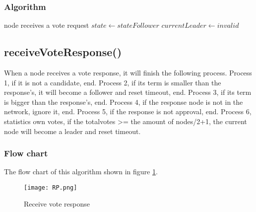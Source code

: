 \documentclass{report}
\begin{document}
\subsubsection{Algorithm}
\begin{simpleAlgorithm}{node receives a vote request}
     
        \State {}
        \State $state \gets stateFollower$
        \State {}
    \EndIf
     
        \State {}
        \State $currentLeader \gets invalid$
        \State {}
    \Else
        \State {}
    \EndIf
    \State {}
   \EndProcedure
\end{simpleAlgorithm}


\subsection{receiveVoteResponse()}
When a node receives a vote response, it will finish the following process. Process 1, if it is not a candidate, end. Process 2, if its term is smaller than the response’s, it will become a follower and reset timeout, end. Process 3, if its term is bigger than the response’s, end. Process 4, if the response node is not in the network, ignore it, end. Process 5, if the response is not approval, end. Process 6, statistics own votes, if the totalvotes >= the amount of nodes/2+1, the current node will become a leader and reset timeout.
\subsubsection{Flow chart}
The flow chart of this algorithm shown in figure \ref{fig:RP}.
\begin{figure}[H]
    \centering
    \texttt{[image: RP.png]}
    \caption{Receive vote response}
    \label{fig:RP}
\end{figure}
\end{document}
